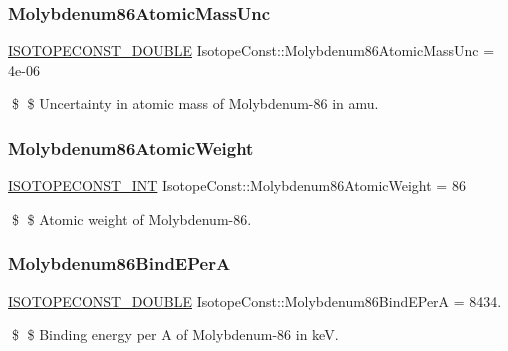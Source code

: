 \subsubsection{\texorpdfstring{Molybdenum86\+Atomic\+Mass\+Unc}{Molybdenum86AtomicMassUnc}}
{\footnotesize\ttfamily \mbox{\hyperlink{group___isotope_const-_macros_ga8f45a7272ce02c0b4c65c44636ed719a}{I\+S\+O\+T\+O\+P\+E\+C\+O\+N\+S\+T\+\_\+\+D\+O\+U\+B\+LE}} Isotope\+Const\+::\+Molybdenum86\+Atomic\+Mass\+Unc = 4e-\/06}

\$ \$ Uncertainty in atomic mass of Molybdenum-\/86 in amu. \mbox{\label{group___isotope_const-_molybdenum-_mo86_ga2e9943929df6134406c1e7f4cde27fcc}} 
\subsubsection{\texorpdfstring{Molybdenum86\+Atomic\+Weight}{Molybdenum86AtomicWeight}}
{\footnotesize\ttfamily \mbox{\hyperlink{group___isotope_const-_macros_ga5f18360b3e99483a35c32d789e62621c}{I\+S\+O\+T\+O\+P\+E\+C\+O\+N\+S\+T\+\_\+\+I\+NT}} Isotope\+Const\+::\+Molybdenum86\+Atomic\+Weight = 86}

\$ \$ Atomic weight of Molybdenum-\/86. \mbox{\label{group___isotope_const-_molybdenum-_mo86_gabb899760bbc3a25db12a9990f4a5317d}} 
\subsubsection{\texorpdfstring{Molybdenum86\+Bind\+E\+PerA}{Molybdenum86BindEPerA}}
{\footnotesize\ttfamily \mbox{\hyperlink{group___isotope_const-_macros_ga8f45a7272ce02c0b4c65c44636ed719a}{I\+S\+O\+T\+O\+P\+E\+C\+O\+N\+S\+T\+\_\+\+D\+O\+U\+B\+LE}} Isotope\+Const\+::\+Molybdenum86\+Bind\+E\+PerA = 8434.}

\$ \$ Binding energy per A of Molybdenum-\/86 in keV. \mbox{\label{group___isotope_const-_molybdenum-_mo86_ga0853f345ca12dbe88409d9880e8b412a}} 
